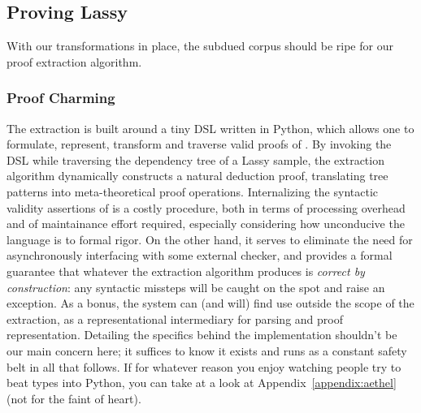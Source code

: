 \subsection{Proving Lassy}
With our transformations in place, the subdued corpus should be ripe for our proof extraction algorithm.

\subsubsection{Proof Charming}
The extraction is built around a tiny DSL written in Python, which allows one to formulate, represent, transform and traverse valid proofs of \NLPplus.
By invoking the DSL while traversing the dependency tree of a Lassy sample, the extraction algorithm dynamically constructs a natural deduction proof, translating tree patterns into meta-theoretical proof operations.
Internalizing the syntactic validity assertions of \NLPplus{} is a costly procedure, both in terms of processing overhead and of maintainance effort required, especially considering how unconducive the language is to formal rigor.
On the other hand, it serves to eliminate the need for asynchronously interfacing with some external checker, and provides a formal guarantee that whatever the extraction algorithm produces is \textit{correct by construction}: any syntactic missteps will be caught on the spot and raise an exception.
As a bonus, the system can (and will) find use outside the scope of the extraction, as a representational intermediary for parsing and proof representation.
Detailing the specifics behind the implementation shouldn't be our main concern here; it suffices to know it exists and runs as a constant safety belt in all that follows.
If for whatever reason you enjoy watching people try to beat types into Python, you can take at a look at Appendix~\ref{appendix:aethel} (not for the faint of heart).

